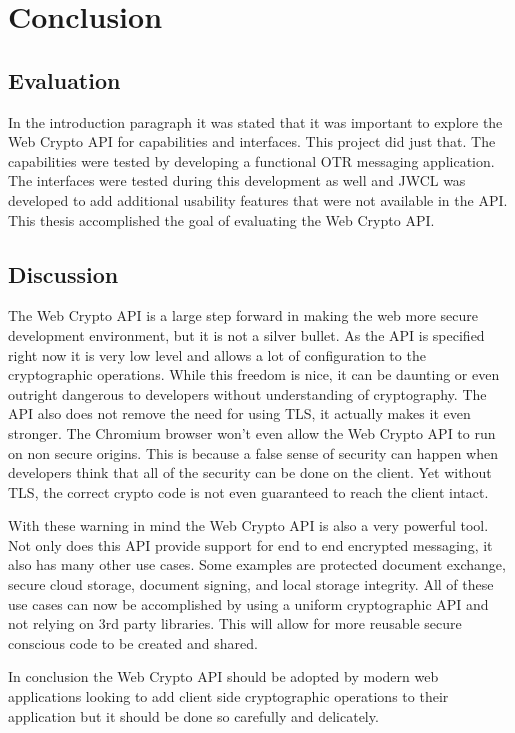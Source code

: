 \chapter{Conclusion}


\section{Evaluation}


In the introduction paragraph it was stated that it was important to explore the Web Crypto API for capabilities and interfaces. This project did just that. The capabilities were tested by developing a functional OTR messaging application. The interfaces were tested during this development as well and JWCL was developed to add additional usability features that were not available in the API. This thesis accomplished the goal of evaluating the Web Crypto API.


\section{Discussion}


The Web Crypto API is a large step forward in making the web more secure development environment, but it is not a silver bullet. As the API is specified right now it is very low level and allows a lot of configuration to the cryptographic operations. While this freedom is nice, it can be daunting or even outright dangerous to developers without understanding of cryptography. The API also does not remove the need for using TLS, it actually makes it even stronger. The Chromium browser won't even allow the Web Crypto API to run on non secure origins. This is because a false sense of security can happen when developers think that all of the security can be done on the client. Yet without TLS, the correct crypto code is not even guaranteed to reach the client intact. 


With these warning in mind the Web Crypto API is also a very powerful tool. Not only does this API provide support for end to end encrypted messaging, it also has many other use cases. Some examples are protected document exchange, secure cloud storage, document signing, and local storage integrity. All of these use cases can now be accomplished by using a uniform cryptographic API and not relying on 3rd party libraries. This will allow for more reusable secure conscious code to be created and shared. 


In conclusion the Web Crypto API should be adopted by modern web applications looking to add client side cryptographic operations to their application but it should be done so carefully and delicately.

